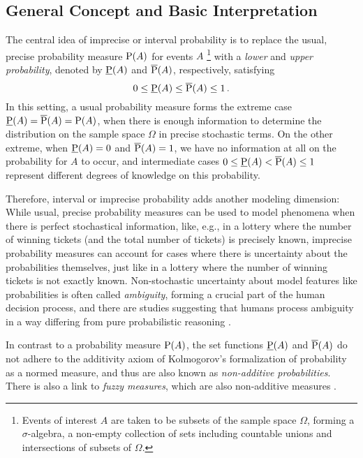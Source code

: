 

\subsection{General Concept and Basic Interpretation}
\label{sec:ip-general}

The central idea of imprecise or interval probability \parencite{1991:walley, 2001:weichselberger, 2011:IESS-ip} is
to replace the usual, precise probability measure $\operatorname{P}(A)$ for events $A$%
\footnote{Events of interest $A$ are taken to be subsets of the sample space $\Omega$,
forming a $\sigma$-algebra, a non-empty collection of sets including countable unions and intersections of subsets of $\Omega$.}
with a \emph{lower} and \emph{upper probability}, denoted by $\underline{\operatorname{P}}(A)$ and $\overline{\operatorname{P}}(A)$, respectively,
satisfying
\begin{equation}
\label{eq:0ip1}
0 \le \underline{\operatorname{P}}(A) \le \overline{\operatorname{P}}(A) \le 1\,.
\end{equation}
In this setting, a usual probability measure forms the extreme case $\underline{\operatorname{P}}(A) = \overline{\operatorname{P}}(A) = \operatorname{P}(A)$,
when there is enough information to determine the distribution on the sample space $\Omega$
in precise stochastic terms.
On the other extreme, when $\underline{\operatorname{P}}(A) = 0$ and $\overline{\operatorname{P}}(A) = 1$,
we have no information at all on the probability for $A$ to occur,
and intermediate cases $0 \le \underline{\operatorname{P}}(A) < \overline{\operatorname{P}}(A) \le 1$ represent
different degrees of knowledge on this probability.

Therefore, interval or imprecise probability adds another modeling dimension:
While usual, precise probability measures can be used to model phenomena when there is perfect stochastical information,
like, e.g., in a lottery where the number of winning tickets (and the total number of tickets) is precisely known,
imprecise probability measures can account for cases where there is uncertainty about the probabilities themselves,
just like in a lottery where the number of winning tickets is not exactly known.
Non-stochastic uncertainty about model features like probabilities is often called \emph{ambiguity},
forming a crucial part of the human decision process,
and there are studies suggesting that humans process ambiguity in a way
differing from pure probabilistic reasoning \parencite{2005:hsu-bhatt}.

In contrast to a probability measure $\operatorname{P}(A)$,
the set functions $\underline{\operatorname{P}}(A)$ and $\overline{\operatorname{P}}(A)$ do not adhere
to the additivity axiom of Kolmogorov's \parencite*{1933:kolmogorov}
formalization of probability as a normed measure,
and thus are also known as \emph{non-additive probabilities}.
There is also a link to \emph{fuzzy measures}, which are also non-additive measures
\parencite[see, e.g.,][]{1997:denneberg}.

